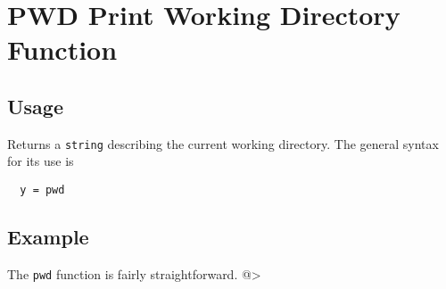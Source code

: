 \section{PWD Print Working Directory Function}

\subsection{Usage}

Returns a \verb|string| describing the current working directory.  The general syntax for its use is
\begin{verbatim}
  y = pwd
\end{verbatim}

\subsection{Example}

The \verb|pwd| function is fairly straightforward.
@>
